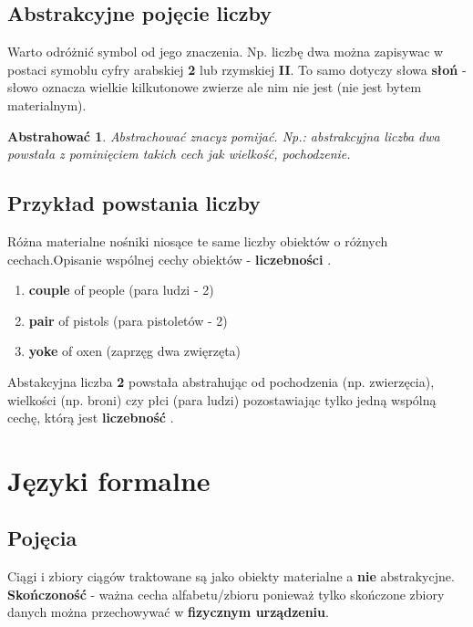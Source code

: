  \subsection{Abstrakcyjne pojęcie liczby}


Warto odróżnić symbol od jego znaczenia. Np. liczbę dwa można zapisywac w postaci symoblu cyfry arabskiej { \bf 2} lub rzymskiej  { \bf II}. To samo dotyczy słowa { \bf słoń } - słowo oznacza wielkie kilkutonowe zwierze ale nim nie jest (nie jest bytem materialnym). 

\newtheorem*{theorem2*}{Abstrahować}
\begin{theorem2*} Abstrachować znacyz pomijać. Np.: abstrakcyjna liczba dwa powstała z pominięciem takich cech jak wielkość, pochodzenie.
 \end{theorem2*}
 
\subsection{Przykład powstania liczby}
Różna materialne nośniki niosące te same liczby obiektów o różnych cechach.Opisanie wspólnej cechy obiektów - { \bf liczebności} .

 
\begin{enumerate}[label=(\roman*)]
  \item {\bf couple} of people (para ludzi - 2)
  \item {\bf pair} of pistols (para pistoletów - 2)
  \item {\bf yoke} of oxen (zaprzęg dwa zwięrzęta)
\end{enumerate}
 
 

Abstakcyjna liczba { \bf 2} powstała abstrahując od pochodzenia (np. zwierzęcia), wielkości (np. broni) czy płci (para ludzi) pozostawiając tylko jedną wspólną cechę, którą jest { \bf liczebność} . 
 


\section{Języki formalne}
\subsection{Pojęcia}

Ciągi i zbiory ciągów traktowane są jako obiekty materialne a { \bf nie } abstrakycjne. \newline
{ \bf Skończoność} - ważna cecha alfabetu/zbioru ponieważ tylko skończone zbiory danych można przechowywać w { \bf fizycznym urządzeniu}. 

